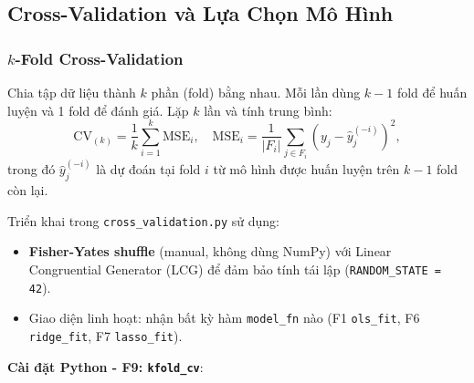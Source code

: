 ﻿\subsection{Cross-Validation và Lựa Chọn Mô Hình}


\subsubsection{$k$-Fold Cross-Validation}

\begin{tcolorbox}[mycodebox, colback=blue!3!white, colframe=blue!40!black,
    title={\textbf{Định nghĩa 1.5} - $k$-Fold Cross-Validation}]
Chia tập dữ liệu thành $k$ phần (fold) bằng nhau. Mỗi lần dùng $k-1$
fold để huấn luyện và 1 fold để đánh giá. Lặp $k$ lần và tính trung bình:
\begin{equation}
    \mathrm{CV}_{(k)} = \frac{1}{k}\sum_{i=1}^{k} \mathrm{MSE}_i,
    \quad
    \mathrm{MSE}_i = \frac{1}{|F_i|}\sum_{j \in F_i}(y_j - \hat{y}_j^{(-i)})^2,
    \label{eq:cv}
\end{equation}
trong đó $\hat{y}_j^{(-i)}$ là dự đoán tại fold $i$ từ mô hình được huấn
luyện trên $k-1$ fold còn lại.
\end{tcolorbox}

Triển khai trong \texttt{cross\_validation.py} sử dụng:
\begin{itemize}
    \item \textbf{Fisher-Yates shuffle} (manual, không dùng NumPy) với
          Linear Congruential Generator (LCG) để đảm bảo tính tái lập
          (\texttt{RANDOM\_STATE = 42}).
    \item Giao diện linh hoạt: nhận bất kỳ hàm \texttt{model\_fn} nào
          (F1 \texttt{ols\_fit}, F6 \texttt{ridge\_fit}, F7 \texttt{lasso\_fit}).
\end{itemize}

\textbf{Cài đặt Python - F9: \texttt{kfold\_cv}}:

